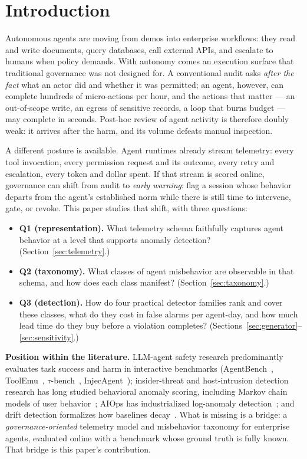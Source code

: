 \documentclass[10pt]{article}
\begin{document}
\section{Introduction}
\label{sec:intro}

Autonomous agents are moving from demos into enterprise workflows: they read
and write documents, query databases, call external APIs, and escalate to
humans when policy demands. With autonomy comes an execution surface that
traditional governance was not designed for. A conventional audit asks
\emph{after the fact} what an actor did and whether it was permitted; an agent,
however, can complete hundreds of micro-actions per hour, and the actions that
matter --- an out-of-scope write, an egress of sensitive records, a loop that
burns budget --- may complete in seconds. Post-hoc review of agent activity is
therefore doubly weak: it arrives after the harm, and its volume defeats manual
inspection.

A different posture is available. Agent runtimes already stream telemetry:
every tool invocation, every permission request and its outcome, every retry
and escalation, every token and dollar spent. If that stream is scored online,
governance can shift from audit to \emph{early warning}: flag a session whose
behavior departs from the agent's established norm while there is still time to
intervene, gate, or revoke. This paper studies that shift, with three
questions:
\begin{itemize}
  \item \textbf{Q1 (representation).} What telemetry schema faithfully captures
        agent behavior at a level that supports anomaly detection? (Section~\ref{sec:telemetry}.)
  \item \textbf{Q2 (taxonomy).} What classes of agent misbehavior are
        observable in that schema, and how does each class manifest? (Section~\ref{sec:taxonomy}.)
  \item \textbf{Q3 (detection).} How do four practical detector families rank
        and cover these classes, what do they cost in false alarms per
        agent-day, and how much lead time do they buy before a violation
        completes? (Sections~\ref{sec:generator}--\ref{sec:sensitivity}.)
\end{itemize}

\noindent\textbf{Position within the literature.} LLM-agent safety research
predominantly evaluates task success and harm in interactive benchmarks
(AgentBench~\cite{agentbench}, ToolEmu~\cite{toolemu}, $\tau$-bench~\cite{taubench},
InjecAgent~\cite{injecagent}); insider-threat and host-intrusion detection
research has long studied behavioral anomaly scoring, including Markov chain
models of user behavior~\cite{yemarkov,yeung2003}; AIOps has industrialized
log-anomaly detection~\cite{he2021}; and drift detection formalizes how
baselines decay~\cite{gama2014}. What is missing is a bridge: a
\emph{governance-oriented} telemetry model and misbehavior taxonomy for
enterprise agents, evaluated online with a benchmark whose ground truth is
fully known. That bridge is this paper's contribution.
\end{document}
